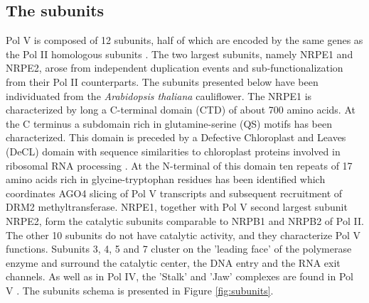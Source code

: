 \documentclass[a4paper, twocolumn]{article}
\begin{document}
\subsection{The subunits}
Pol V is composed of 12 subunits, half of which are encoded by the same genes as the Pol II homologous subunits \cite{ZHOU2015}. The two largest subunits, namely NRPE1 and NRPE2, arose from independent duplication events and sub-functionalization from their Pol II counterparts. The subunits presented below have been individuated from the  \textit{Arabidopsis thaliana} cauliflower. 
The NRPE1 is characterized by long a C-terminal domain (CTD) of about 700 amino acids. At the C terminus a subdomain rich in glutamine-serine (QS) motifs has been characterized. This domain is preceded by a Defective Chloroplast and Leaves (DeCL) domain with sequence similarities to chloroplast proteins involved in ribosomal RNA processing \cite{HUANG2015}. At the N-terminal of this domain ten repeats of 17 amino acids rich in glycine-tryptophan residues has been identified which coordinates AGO4 slicing of Pol V transcripts and subsequent recruitment of DRM2 methyltransferase.
NRPE1, together with Pol V second largest subunit NRPE2, form the catalytic subunits comparable to NRPB1 and NRPB2 of Pol II. 
The other 10 subunits do not have catalytic activity, and they characterize Pol V functions. Subunits 3, 4, 5  and 7 cluster on the 'leading face' of the polymerase enzyme and surround the catalytic center, the DNA entry and the RNA exit channels.
As well as in Pol IV, the 'Stalk' and 'Jaw' complexes are found in Pol V \cite{HAAG2011}. The subunits schema is presented in Figure \ref{fig:subunits}.
\end{document}
